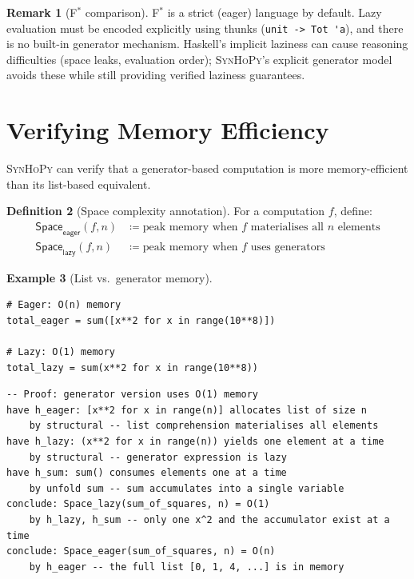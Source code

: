 \documentclass[11pt,a4paper]{report}
\theoremstyle{definition}
\newtheorem{definition}{Definition}[chapter]
\newtheorem{example}[definition]{Example}
\newtheorem{remark}[definition]{Remark}
\theoremstyle{plain}
\newcommand{\defeq}{\coloneqq}
\newcommand{\fstar}{F$^{*}$}
\newcommand{\synhopy}{\textsc{SynHoPy}}
\begin{document}
\begin{remark}[\fstar{} comparison]
\fstar{} is a strict (eager) language by default.  Lazy evaluation must be
encoded explicitly using thunks (\lstinline[style=fstar]|unit -> Tot 'a|),
and there is no built-in generator mechanism.  Haskell's implicit laziness
can cause reasoning difficulties (space leaks, evaluation order);
\synhopy{}'s explicit generator model avoids these while still providing
verified laziness guarantees.
\end{remark}

\section{Verifying Memory Efficiency}

\synhopy{} can verify that a generator-based computation is more memory-efficient
than its list-based equivalent.

\begin{definition}[Space complexity annotation]
For a computation $f$, define:
\begin{align}
  \mathsf{Space}_{\mathsf{eager}}(f, n) &\defeq
    \text{peak memory when } f \text{ materialises all } n \text{ elements} \\
  \mathsf{Space}_{\mathsf{lazy}}(f, n) &\defeq
    \text{peak memory when } f \text{ uses generators}
\end{align}
\end{definition}

\begin{example}[List vs.\ generator memory]
\begin{lstlisting}[style=python]
# Eager: O(n) memory
total_eager = sum([x**2 for x in range(10**8)])

# Lazy: O(1) memory
total_lazy = sum(x**2 for x in range(10**8))
\end{lstlisting}
\end{example}

\begin{lstlisting}[style=proof]
-- Proof: generator version uses O(1) memory
have h_eager: [x**2 for x in range(n)] allocates list of size n
    by structural -- list comprehension materialises all elements
have h_lazy: (x**2 for x in range(n)) yields one element at a time
    by structural -- generator expression is lazy
have h_sum: sum() consumes elements one at a time
    by unfold sum -- sum accumulates into a single variable
conclude: Space_lazy(sum_of_squares, n) = O(1)
    by h_lazy, h_sum -- only one x^2 and the accumulator exist at a time
conclude: Space_eager(sum_of_squares, n) = O(n)
    by h_eager -- the full list [0, 1, 4, ...] is in memory
\end{lstlisting}
\end{document}
